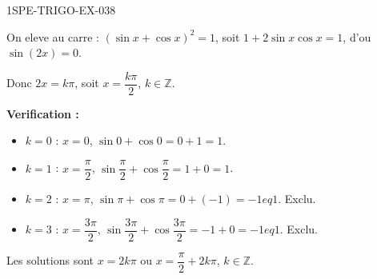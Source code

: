 \begin{corrige}{1SPE-TRIGO-EX-038}

On eleve au carre : $(\sin x + \cos x)^2 = 1$, soit $1 + 2\sin x\cos x = 1$, d'ou $\sin(2x) = 0$.

Donc $2x = k\pi$, soit $x = \dfrac{k\pi}{2}$, $k \in \mathbb{Z}$.

\textbf{Verification :}
\begin{itemize}
  \item $k = 0$ : $x = 0$, $\sin 0 + \cos 0 = 0 + 1 = 1$. \checkmark
  \item $k = 1$ : $x = \dfrac{\pi}{2}$, $\sin\dfrac{\pi}{2} + \cos\dfrac{\pi}{2} = 1 + 0 = 1$. \checkmark
  \item $k = 2$ : $x = \pi$, $\sin\pi + \cos\pi = 0 + (-1) = -1 
eq 1$. Exclu.
  \item $k = 3$ : $x = \dfrac{3\pi}{2}$, $\sin\dfrac{3\pi}{2} + \cos\dfrac{3\pi}{2} = -1 + 0 = -1 
eq 1$. Exclu.
\end{itemize}

Les solutions sont $x = 2k\pi$ ou $x = \dfrac{\pi}{2} + 2k\pi$, $k \in \mathbb{Z}$.

\end{corrige}
